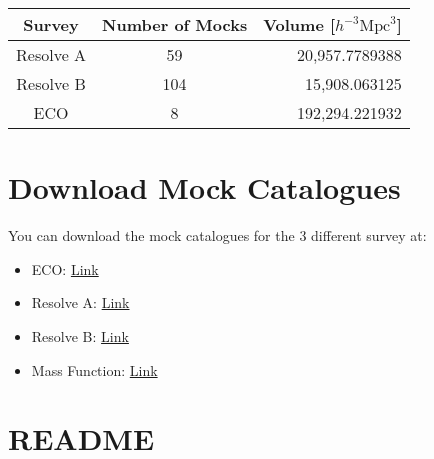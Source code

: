 \documentclass[a4paper, 11pt]{article}
\begin{document}
\begin{centering}
\begin{tabular}{|c|c|r|}
\hline
Survey    & Number of Mocks & Volume [$h^{-3}\textrm{Mpc}^{3}$] \\\hline
Resolve A & 59              & 20,957.7789388\\ \hline
Resolve B & 104             & 15,908.063125\\ \hline
ECO       & 8               & 192,294.221932 \\\hline
\end{tabular}

\end{centering}

\section{Download Mock Catalogues}\label{sec:download}

You can download the mock catalogues for the 3 different survey at:

\begin{itemize}
    \item ECO: \href{http://vpac00.phy.vanderbilt.edu/~caldervf/ECO_A_B_Updated/ECO}{Link}
    \item Resolve A: \href{http://vpac00.phy.vanderbilt.edu/~caldervf/ECO_A_B_Updated/Resolve_A}{Link}
    \item Resolve B: \href{http://vpac00.phy.vanderbilt.edu/~caldervf/ECO_A_B_Updated/Resolve_B/}{Link}
    \item Mass Function: \href{http://vpac00.phy.vanderbilt.edu/~caldervf/ECO_A_B_Updated/Mass_Function/}{Link}
\end{itemize}

\section{README}\label{sec:README}




\end{document}
